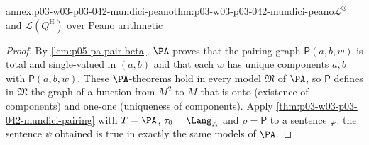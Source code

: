 \begin{annexitem}{annex:p03-w03-p03-042-mundici-peano}{thm:p03-w03-p03-042-mundici-peano}{\(\mathscr L^{\circledR}\) and \(\mathscr L(Q^{\mathrm H})\) over Peano arithmetic}
\begin{proof}
By \cref{lem:p05-pa-pair-beta}, \(\PA\) proves that the pairing graph
\(\mathsf P(a,b,w)\) is total and single-valued in \((a,b)\) and that each
\(w\) has unique components \(a,b\) with \(\mathsf P(a,b,w)\).  These
\(\PA\)-theorems hold in every model \(\mathfrak M\) of \(\PA\), so
\(\mathsf P\) defines in \(\mathfrak M\) the graph of a function from
\(M^2\) to \(M\) that is onto (existence of components) and one-one
(uniqueness of components).  Apply
\cref{thm:p03-w03-p03-042-mundici-pairing} with \(T=\PA\),
\(\tau_0=\Lang_A\) and \(\rho=\mathsf P\) to a sentence \(\varphi\): the
sentence \(\psi\) obtained is true in exactly the same models of \(\PA\).
\end{proof}
\end{annexitem}

